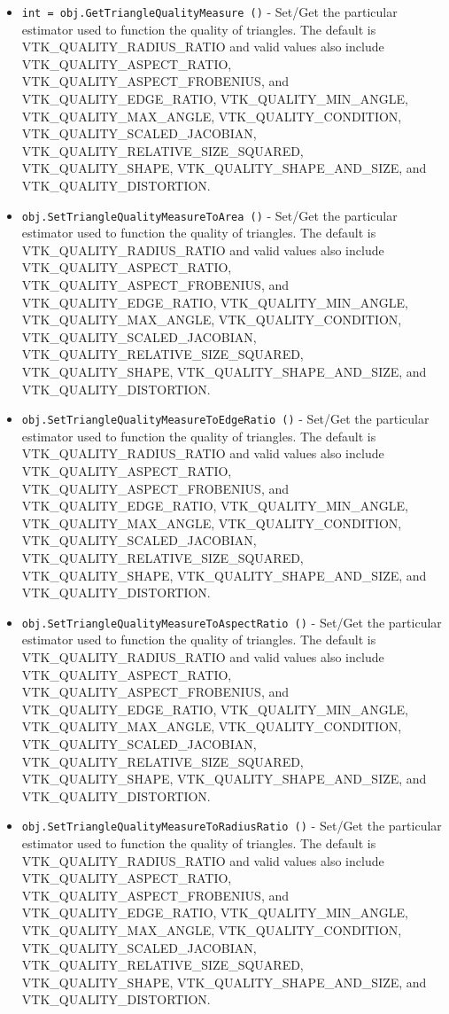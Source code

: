\begin{itemize}
\item  \verb|int = obj.GetTriangleQualityMeasure ()| -  Set/Get the particular estimator used to function the quality of triangles.
 The default is VTK\_QUALITY\_RADIUS\_RATIO and valid values also include
 VTK\_QUALITY\_ASPECT\_RATIO, VTK\_QUALITY\_ASPECT\_FROBENIUS, and VTK\_QUALITY\_EDGE\_RATIO,
 VTK\_QUALITY\_MIN\_ANGLE, VTK\_QUALITY\_MAX\_ANGLE, VTK\_QUALITY\_CONDITION,
 VTK\_QUALITY\_SCALED\_JACOBIAN, VTK\_QUALITY\_RELATIVE\_SIZE\_SQUARED,
 VTK\_QUALITY\_SHAPE, VTK\_QUALITY\_SHAPE\_AND\_SIZE, and VTK\_QUALITY\_DISTORTION.

\item  \verb|obj.SetTriangleQualityMeasureToArea ()| -  Set/Get the particular estimator used to function the quality of triangles.
 The default is VTK\_QUALITY\_RADIUS\_RATIO and valid values also include
 VTK\_QUALITY\_ASPECT\_RATIO, VTK\_QUALITY\_ASPECT\_FROBENIUS, and VTK\_QUALITY\_EDGE\_RATIO,
 VTK\_QUALITY\_MIN\_ANGLE, VTK\_QUALITY\_MAX\_ANGLE, VTK\_QUALITY\_CONDITION,
 VTK\_QUALITY\_SCALED\_JACOBIAN, VTK\_QUALITY\_RELATIVE\_SIZE\_SQUARED,
 VTK\_QUALITY\_SHAPE, VTK\_QUALITY\_SHAPE\_AND\_SIZE, and VTK\_QUALITY\_DISTORTION.

\item  \verb|obj.SetTriangleQualityMeasureToEdgeRatio ()| -  Set/Get the particular estimator used to function the quality of triangles.
 The default is VTK\_QUALITY\_RADIUS\_RATIO and valid values also include
 VTK\_QUALITY\_ASPECT\_RATIO, VTK\_QUALITY\_ASPECT\_FROBENIUS, and VTK\_QUALITY\_EDGE\_RATIO,
 VTK\_QUALITY\_MIN\_ANGLE, VTK\_QUALITY\_MAX\_ANGLE, VTK\_QUALITY\_CONDITION,
 VTK\_QUALITY\_SCALED\_JACOBIAN, VTK\_QUALITY\_RELATIVE\_SIZE\_SQUARED,
 VTK\_QUALITY\_SHAPE, VTK\_QUALITY\_SHAPE\_AND\_SIZE, and VTK\_QUALITY\_DISTORTION.

\item  \verb|obj.SetTriangleQualityMeasureToAspectRatio ()| -  Set/Get the particular estimator used to function the quality of triangles.
 The default is VTK\_QUALITY\_RADIUS\_RATIO and valid values also include
 VTK\_QUALITY\_ASPECT\_RATIO, VTK\_QUALITY\_ASPECT\_FROBENIUS, and VTK\_QUALITY\_EDGE\_RATIO,
 VTK\_QUALITY\_MIN\_ANGLE, VTK\_QUALITY\_MAX\_ANGLE, VTK\_QUALITY\_CONDITION,
 VTK\_QUALITY\_SCALED\_JACOBIAN, VTK\_QUALITY\_RELATIVE\_SIZE\_SQUARED,
 VTK\_QUALITY\_SHAPE, VTK\_QUALITY\_SHAPE\_AND\_SIZE, and VTK\_QUALITY\_DISTORTION.

\item  \verb|obj.SetTriangleQualityMeasureToRadiusRatio ()| -  Set/Get the particular estimator used to function the quality of triangles.
 The default is VTK\_QUALITY\_RADIUS\_RATIO and valid values also include
 VTK\_QUALITY\_ASPECT\_RATIO, VTK\_QUALITY\_ASPECT\_FROBENIUS, and VTK\_QUALITY\_EDGE\_RATIO,
 VTK\_QUALITY\_MIN\_ANGLE, VTK\_QUALITY\_MAX\_ANGLE, VTK\_QUALITY\_CONDITION,
 VTK\_QUALITY\_SCALED\_JACOBIAN, VTK\_QUALITY\_RELATIVE\_SIZE\_SQUARED,
 VTK\_QUALITY\_SHAPE, VTK\_QUALITY\_SHAPE\_AND\_SIZE, and VTK\_QUALITY\_DISTORTION.


\end{itemize}
